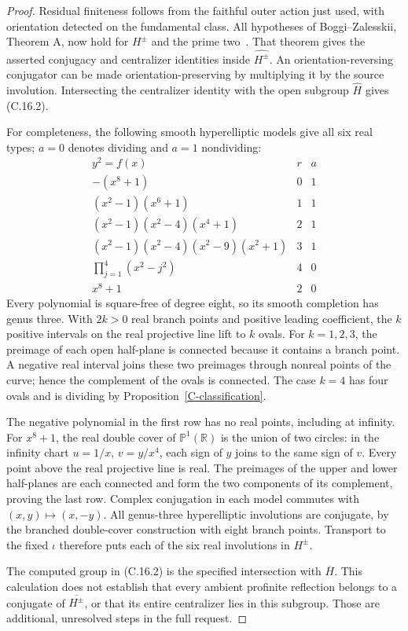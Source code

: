\begin{proof}
Residual finiteness follows from the faithful outer action
just used, with orientation detected on the fundamental
class. All hypotheses of Boggi--Zalesskii, Theorem A, now
hold for $H^{\pm}$ and the prime two~\cite{BoggiZalesskii2024}.
That theorem gives the asserted conjugacy and centralizer
identities inside $\widehat{H^{\pm}}$. An
orientation-reversing conjugator can be made
orientation-preserving by multiplying it by the source
involution. Intersecting the centralizer identity with the
open subgroup $\widehat H$ gives (C.16.2).

For completeness, the following smooth hyperelliptic models
give all six real types; $a=0$ denotes dividing and $a=1$
nondividing:
\[
\begin{array}{c|c|c}
 y^2=f(x)&r&a\\ \hline
 -(x^8+1)&0&1\\
 (x^2-1)(x^6+1)&1&1\\
 (x^2-1)(x^2-4)(x^4+1)&2&1\\
 (x^2-1)(x^2-4)(x^2-9)(x^2+1)&3&1\\
 \prod_{j=1}^{4}(x^2-j^2)&4&0\\
 x^8+1&2&0
\end{array}
\tag{C.16.4}
\]
Every polynomial is square-free of degree eight, so its smooth
completion has genus three. With $2k>0$ real branch points
and positive leading coefficient, the $k$ positive intervals
on the real projective line lift to $k$ ovals. For
$k=1,2,3$, the preimage of each open half-plane is connected
because it contains a branch point. A negative real interval
joins these two preimages through nonreal points of the curve;
hence the complement of the ovals is connected. The case
$k=4$ has four ovals and is dividing by
Proposition~\ref{C-classification}.

The negative polynomial in the first row has no real points,
including at infinity. For $x^8+1$, the real double cover of
$\mathbb P^1(\mathbb R)$ is the union of two circles: in the
infinity chart $u=1/x$, $v=y/x^4$, each sign of $y$ joins to
the same sign of $v$. Every point above the real projective
line is real. The preimages of the upper and lower half-planes
are each connected and form the two components of its
complement, proving the last row. Complex conjugation in
each model commutes with $(x,y)\mapsto(x,-y)$. All genus-three
hyperelliptic involutions are conjugate, by the branched
double-cover construction with eight branch points. Transport
to the fixed $\iota$ therefore puts each of the six real
involutions in $H^{\pm}$.

The computed group in (C.16.2) is the specified intersection
with $\overline H$. This calculation does not establish that
every ambient profinite reflection belongs to a conjugate
of $\overline{H^{\pm}}$, or that its entire centralizer lies
in this subgroup. Those are additional, unresolved steps
in the full request.
\end{proof}


